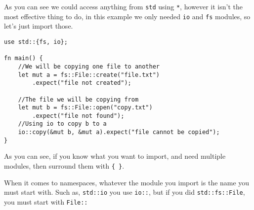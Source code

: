 As you can see we could access anything from \verb!std! using \verb!*!, however it isn't the
most effective thing to do, in this example we only needed \verb!io! and \verb!fs! modules, so 
let's just import those. 
\lstset{style=mystyle}
\begin{lstlisting}
use std::{fs, io};

fn main() {
    //We will be copying one file to another
    let mut a = fs::File::create("file.txt")
        .expect("file not created");

    //The file we will be copying from
    let mut b = fs::File::open("copy.txt")
        .expect("file not found");
    //Using io to copy b to a
    io::copy(&mut b, &mut a).expect("file cannot be copied");
} 
\end{lstlisting}

As you can see, if you know what you want to import, and need multiple modules, then
surround them with \verb!{ }!. 

\begin{remark}
\par When it comes to namespaces, whatever the module you import is the name
you must start with. Such as, \verb!std::io! you use \verb!io::!, but if you did \verb!std::fs::File!, you must start with \verb!File::!
\end{remark}

